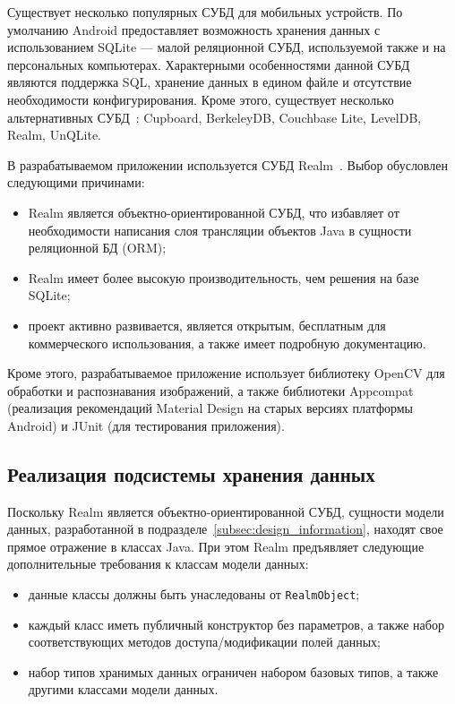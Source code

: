 Существует несколько популярных СУБД для мобильных устройств.
По умолчанию Android предоставляет возможность хранения
данных с использованием SQLite --- малой реляционной СУБД,
используемой также и на персональных компьютерах.
Характерными особенностями данной СУБД являются поддержка SQL,
хранение данных в едином файле и отсутствие необходимости конфигурирования.
Кроме этого, существует несколько альтернативных СУБД~\cite{mobile_db}:
Cupboard, BerkeleyDB, Couchbase Lite, LevelDB, Realm, UnQLite.

В разрабатываемом приложении используется СУБД Realm~\cite{realm_official}.
Выбор обусловлен следующими причинами:
\begin{itemize}
  \item Realm является объектно-ориентированной СУБД,
    что избавляет от необходимости написания слоя трансляции объектов Java
    в сущности реляционной БД (ORM);
  \item Realm имеет более высокую производительность, чем решения на базе SQLite;
  \item проект активно развивается, является открытым,
    бесплатным для коммерческого использования,
    а также имеет подробную документацию.
\end{itemize}

Кроме этого, разрабатываемое приложение использует библиотеку OpenCV
для обработки и распознавания изображений, а также библиотеки Appcompat
(реализация рекомендаций Material Design на старых версиях платформы Android)
и JUnit (для тестирования приложения).

\subsection{Реализация подсистемы хранения данных}
\label{subsec:implementation_db}

Поскольку Realm является объектно-ориентированной СУБД,
сущности модели данных, разработанной в подразделе~\ref{subsec:design_information},
находят свое прямое отражение в классах Java.
При этом Realm предъявляет следующие дополнительные требования
к классам модели данных:
\begin{itemize}
  \item данные классы должны быть унаследованы от \texttt{RealmObject};
  \item каждый класс иметь публичный конструктор без параметров,
    а также набор соответствующих методов доступа/модификации полей данных;
  \item набор типов хранимых данных ограничен набором базовых типов,
    а также другими классами модели данных.
\end{itemize}

